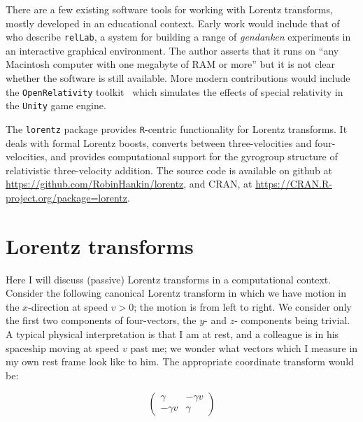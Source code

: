 \documentclass[ijoc,nonblindrev]{informs3} %
\begin{document}
There are a few existing software tools for working with Lorentz
transforms, mostly developed in an educational context.  Early work
would include that of \citet{horwitz1992} who describe {\tt relLab}, a
system for building a range of {\em gendanken} experiments in an
interactive graphical environment.  The author asserts that it runs on
``any Macintosh computer with one megabyte of RAM or more'' but it is
not clear whether the software is still available.  More modern
contributions would include the {\tt OpenRelativity}
toolkit~\citep{sherin2016} which simulates the effects of special
relativity in the {\tt Unity} game engine.

The {\tt lorentz} package provides {\tt R}-centric functionality for
Lorentz transforms.  It deals with formal Lorentz boosts, converts
between three-velocities and four-velocities, and provides
computational support for the gyrogroup structure of relativistic
three-velocity addition.  The source code is available on github at
\url{https://github.com/RobinHankin/lorentz}, and CRAN, at
\url{https://CRAN.R-project.org/package=lorentz}.



\section{Lorentz transforms}

\newcommand{\vvec}[2]{\begin{pmatrix}#1 \\ #2\end{pmatrix}}
\newcommand{\twomat}[4]{\begin{pmatrix} #1 & #2 \\ #3 &
    #4\end{pmatrix}}


Here I will discuss (passive) Lorentz transforms in a computational
context.  Consider the following canonical Lorentz transform in which
we have motion in the $x$-direction at speed $v>0$; the motion is from
left to right.  We consider only the first two components of
four-vectors, the $y$- and $z$- components being trivial.  A typical
physical interpretation is that I am at rest, and a colleague is in
his spaceship moving at speed $v$ past me; we wonder what vectors
which I measure in my own rest frame look like to him.  The
appropriate coordinate transform would be:

\begin{equation*}
\twomat{\gamma}{-\gamma v}{-\gamma v}{\gamma}
\end{equation*}
\end{document}
